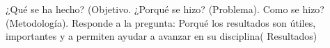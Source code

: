 ¿Qué se ha hecho? (Objetivo. ¿Porqué se hizo? (Problema).  Como se hizo? (Metodología). Responde a la pregunta: Porqué los resultados son útiles, importantes y a permiten ayudar a avanzar en su disciplina( Resultados)